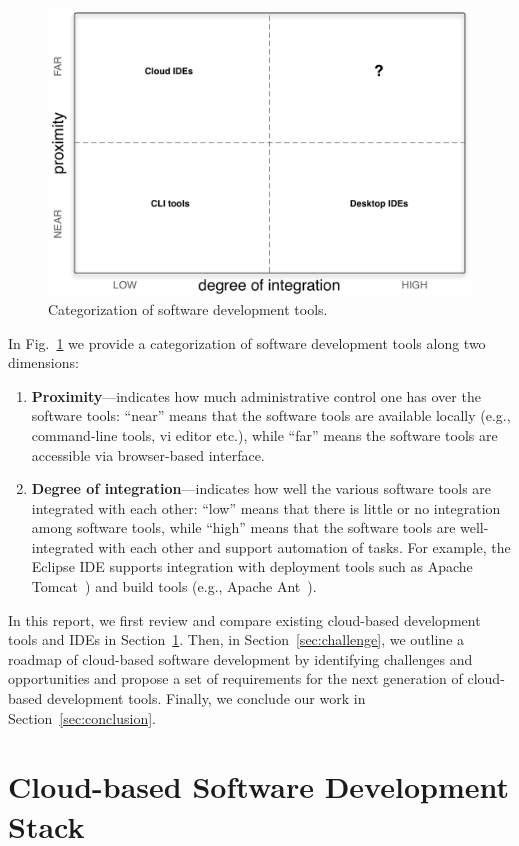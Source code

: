\documentclass[11pt,fleqn,twoside]{article}
\begin{document}
\begin{figure}[ht!]
\begin{center}
\includegraphics[width=0.6\columnwidth]{fig/proximity-vs-integration}
\end{center}
\vspace*{-4ex}
\caption{Categorization of software development tools.}
\label{fig:proximity_integration}
\end{figure}

In Fig.~\ref{fig:proximity_integration} we provide a categorization of software development tools along two dimensions:
\begin{enumerate}
	\item \textbf{Proximity}---indicates how much administrative control one has over the software tools: ``near'' means that the software tools are available locally (e.g., command-line tools, vi editor etc.), while ``far'' means the software tools are accessible via browser-based interface.
	\item \textbf{Degree of integration}---indicates how well the various software tools are integrated with each other: ``low'' means that there is little or no integration among software tools, while ``high'' means that the software tools are well-integrated with each other and support automation of tasks. For example, the Eclipse IDE supports integration with deployment tools such as Apache Tomcat~\cite{tomcat_url}) and build tools (e.g., Apache Ant~\cite{ant_url}).
\end{enumerate}

In this report, we first review and compare existing cloud-based development tools and IDEs in Section~\ref{sec:cbsd}. Then, in Section~\ref{sec:challenge}, we outline a roadmap of cloud-based software development by identifying  challenges and opportunities and propose a set of requirements for the next generation of cloud-based development tools. Finally, we conclude our work in Section~\ref{sec:conclusion}.


\section{Cloud-based Software Development Stack} \label{sec:cbsd}
\end{document}
